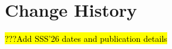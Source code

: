 \thispagestyle{empty}%
\clearpage
\cbstart %
\maketitle
\cbend %
\thispagestyle{empty}%

\clearpage
\section*{Change History}
\thispagestyle{empty}%
\hl{???Add SSS'26 dates and publication details}

